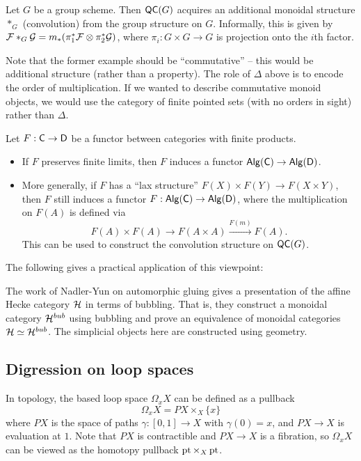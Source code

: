 \documentclass{article}
\begin{document}
\begin{ex}
	Let $G$ be a group scheme.
	Then $\mathsf{QC}(G)$ acquires an additional monoidal structure $*_G$ (convolution) from the group structure on $G$.
	Informally, this is given by $\mathcal{F} *_G \mathcal{G} = m_*(\pi_1^* \mathcal{F} \otimes \pi_2^* \mathcal{G})$, where $\pi_i: G \times G \to G$ is projection onto the $i$th factor.
\end{ex}

Note that the former example should be ``commutative'' -- this would be additional structure (rather than a property).
The role of $\Delta$ above is to encode the order of multiplication.
If we wanted to describe commutative monoid objects, we would use the category of finite pointed sets (with no orders in sight) rather than $\Delta$.

\begin{rmk}
	Let $F: \mathsf{C} \to \mathsf{D}$ be a functor between categories with finite products.
	\begin{itemize}
		\item If $F$ preserves finite limits, then $F$ induces a functor $\mathsf{Alg}(\mathsf{C}) \to \mathsf{Alg}(\mathsf{D})$.
		\item More generally, if $F$ has a ``lax structure'' $F(X) \times F(Y) \to F(X \times Y)$, then $F$ still induces a functor $F: \mathsf{Alg}(\mathsf{C}) \to \mathsf{Alg}(\mathsf{D})$, where the multiplication on $F(A)$ is defined via
			\[
				F(A) \times F(A) \to F(A \times A) \xrightarrow{F(m)} F(A).
			\]
			This can be used to construct the convolution structure on $\mathsf{QC}(G)$.
	\end{itemize}
\end{rmk}

The following gives a practical application of this viewpoint:

\begin{ex}
	The work of Nadler-Yun on automorphic gluing gives a presentation of the affine Hecke category $\mathcal{H}$ in terms of bubbling.
	That is, they construct a monoidal category $\mathcal{H}^{bub}$ using bubbling and prove an equivalence of monoidal categories $\mathcal{H} \simeq \mathcal{H}^{bub}$.
	The simplicial objects here are constructed using geometry.
\end{ex}

\subsection{Digression on loop spaces}

In topology, the based loop space $\Omega_x X$ can be defined as a pullback
\[
	\Omega_x X  = PX \times_X \{ x \}
\]
where $PX$ is the space of paths $\gamma: [0, 1] \to X$ with $\gamma(0) = x$, and $PX \to X$ is evaluation at $1$.
Note that $PX$ is contractible and $PX \to X$ is a fibration, so $\Omega_x X$ can be viewed as the homotopy pullback $\operatorname{pt} \times_X \operatorname{pt}$.
\end{document}
